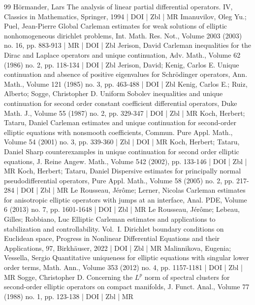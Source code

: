 \documentclass[10pt]{amsart}
\theoremstyle{definition}\newtheorem{defi}[theo]{Definition}\newtheorem{rema}[theo]{Remark}\newtheorem{exam}[theo]{Example}\newtheorem{exem}[theo]{Example}\newtheorem{nota}[theo]{Notation}
\begin{document}
\begin{thebibliography}{99}
 Hörmander, Lars The analysis of linear partial differential operators. IV, Classics in Mathematics, Springer, 1994 | DOI | Zbl | MR
 Imanuvilov, Oleg Yu.; Puel, Jean-Pierre Global Carleman estimates for weak solutions of elliptic nonhomogeneous dirichlet problems, Int. Math. Res. Not., Volume 2003 (2003) no. 16, pp. 883-913 | MR | DOI | Zbl
 Jerison, David Carleman inequalities for the Dirac and Laplace operators and unique continuation, Adv. Math., Volume 62 (1986) no. 2, pp. 118-134 | DOI | Zbl
 Jerison, David; Kenig, Carlos E. Unique continuation and absence of positive eigenvalues for Schrödinger operators, Ann. Math., Volume 121 (1985) no. 3, pp. 463-488 | DOI | Zbl
 Kenig, Carlos E.; Ruiz, Alberto; Sogge, Christopher D. Uniform Sobolev inequalities and unique continuation for second order constant coefficient differential operators, Duke Math. J., Volume 55 (1987) no. 2, pp. 329-347 | DOI | Zbl | MR
 Koch, Herbert; Tataru, Daniel Carleman estimates and unique continuation for second-order elliptic equations with nonsmooth coefficients, Commun. Pure Appl. Math., Volume 54 (2001) no. 3, pp. 339-360 | Zbl | DOI | MR
 Koch, Herbert; Tataru, Daniel Sharp counterexamples in unique continuation for second order elliptic equations, J. Reine Angew. Math., Volume 542 (2002), pp. 133-146 | DOI | Zbl | MR
 Koch, Herbert; Tataru, Daniel Dispersive estimates for principally normal pseudodifferential operators, Pure Appl. Math., Volume 58 (2005) no. 2, pp. 217-284 | DOI | Zbl | MR
 Le Rousseau, Jérôme; Lerner, Nicolas Carleman estimates for anisotropic elliptic operators with jumps at an interface, Anal. PDE, Volume 6 (2013) no. 7, pp. 1601-1648 | DOI | Zbl | MR
 Le Rousseau, Jérôme; Lebeau, Gilles; Robbiano, Luc Elliptic Carleman estimates and applications to stabilization and controllability. Vol. I. Dirichlet boundary conditions on Euclidean space, Progress in Nonlinear Differential Equations and their Applications, 97, Birkhäuser, 2022 | DOI | Zbl | MR
 Malinnikova, Eugenia; Vessella, Sergio Quantitative uniqueness for elliptic equations with singular lower order terms, Math. Ann., Volume 353 (2012) no. 4, pp. 1157-1181 | DOI | Zbl | MR
 Sogge, Christopher D. Concerning the ${L}^p$ norm of spectral clusters for second-order elliptic operators on compact manifolds, J. Funct. Anal., Volume 77 (1988) no. 1, pp. 123-138 | DOI | Zbl | MR

\end{thebibliography}
\end{document}
